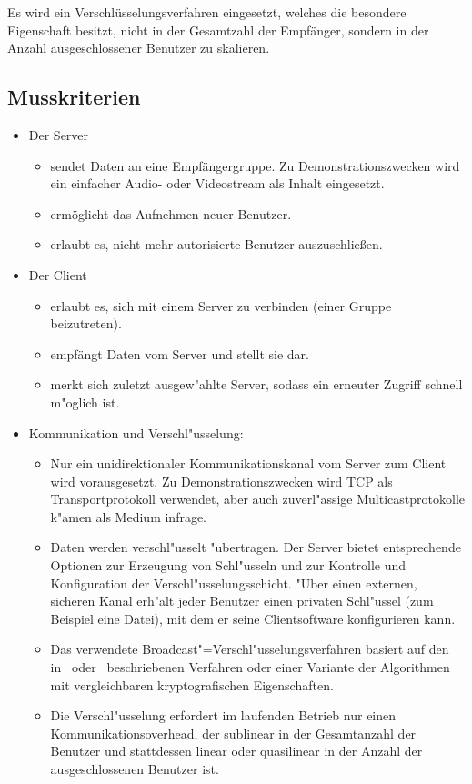 \documentclass[a4paper,10pt]{scrartcl}
\begin{document}
Es wird ein Verschlüsselungsverfahren eingesetzt, welches die besondere
Eigenschaft besitzt, nicht in der Gesamtzahl der Empfänger, sondern in der Anzahl
ausgeschlossener Benutzer zu skalieren.

\subsection{Musskriterien}

\begin{itemize}

\item Der Server
\begin{itemize}
   \item sendet Daten an eine Empfängergruppe. Zu Demonstrationszwecken wird
         ein einfacher Audio- oder Videostream als Inhalt eingesetzt.
   \item ermöglicht das Aufnehmen neuer Benutzer.
   \item erlaubt es, nicht mehr autorisierte Benutzer auszuschließen.
\end{itemize}

\item Der Client
\begin{itemize}
   \item erlaubt es, sich mit einem Server zu verbinden (einer Gruppe beizutreten).
   \item empfängt Daten vom Server und stellt sie dar.
   \item merkt sich zuletzt ausgew"ahlte Server, sodass ein erneuter Zugriff schnell
         m"oglich ist.
\end{itemize}

\item Kommunikation und Verschl"usselung:
\begin{itemize}
   \item Nur ein unidirektionaler Kommunikationskanal vom Server zum Client wird
         vorausgesetzt. Zu Demonstrationszwecken wird TCP als Transportprotokoll
         verwendet, aber auch zuverl"assige Multicastprotokolle k"amen als Medium
         infrage.
   \item Daten werden verschl"usselt "ubertragen. Der Server bietet entsprechende
         Optionen zur Erzeugung von Schl"usseln und zur Kontrolle und Konfiguration
         der Verschl"usselungsschicht. "Uber einen externen, sicheren Kanal erh"alt
         jeder Benutzer einen privaten Schl"ussel (zum Beispiel eine Datei), mit dem er seine
         Clientsoftware konfigurieren kann.
   \item Das verwendete Broadcast"=Verschl"usselungsverfahren basiert auf den
         in~\cite[Section~2.2]{Naor00} oder~\cite{Garg10} beschriebenen Verfahren
         oder einer Variante der Algorithmen mit vergleichbaren kryptografischen
         Eigenschaften.
   \item Die Verschl"usselung erfordert im laufenden Betrieb nur einen
         Kommunikationsoverhead, der sublinear in der Gesamtanzahl der Benutzer und
         stattdessen linear oder quasilinear in der Anzahl der ausgeschlossenen
         Benutzer ist.
\end{itemize}
\end{itemize}
\end{document}
